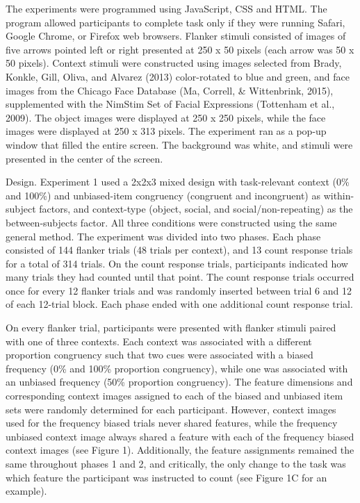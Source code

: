 \documentclass[english,,man,floatsintext]{apa6}
\begin{document}
The experiments were programmed using JavaScript, CSS and HTML. The program allowed participants to complete task only if they were running Safari, Google Chrome, or Firefox web browsers. Flanker stimuli consisted of images of five arrows pointed left or right presented at 250 x 50 pixels (each arrow was 50 x 50 pixels). Context stimuli were constructed using images selected from Brady, Konkle, Gill, Oliva, and Alvarez (2013) color-rotated to blue and green, and face images from the Chicago Face Database (Ma, Correll, \& Wittenbrink, 2015), supplemented with the NimStim Set of Facial Expressions (Tottenham et al., 2009). The object images were displayed at 250 x 250 pixels, while the face images were displayed at 250 x 313 pixels. The experiment ran as a pop-up window that filled the entire screen. The background was white, and stimuli were presented in the center of the screen.

Design. Experiment 1 used a 2x2x3 mixed design with task-relevant context (0\% and 100\%) and unbiased-item congruency (congruent and incongruent) as within-subject factors, and context-type (object, social, and social/non-repeating) as the between-subjects factor.
All three conditions were constructed using the same general method. The experiment was divided into two phases. Each phase consisted of 144 flanker trials (48 trials per context), and 13 count response trials for a total of 314 trials. On the count response trials, participants indicated how many trials they had counted until that point. The count response trials occurred once for every 12 flanker trials and was randomly inserted between trial 6 and 12 of each 12-trial block. Each phase ended with one additional count response trial.

On every flanker trial, participants were presented with flanker stimuli paired with one of three contexts. Each context was associated with a different proportion congruency such that two cues were associated with a biased frequency (0\% and 100\% proportion congruency), while one was associated with an unbiased frequency (50\% proportion congruency). The feature dimensions and corresponding context images assigned to each of the biased and unbiased item sets were randomly determined for each participant. However, context images used for the frequency biased trials never shared features, while the frequency unbiased context image always shared a feature with each of the frequency biased context images (see Figure 1). Additionally, the feature assignments remained the same throughout phases 1 and 2, and critically, the only change to the task was which feature the participant was instructed to count (see Figure 1C for an example).
\end{document}
